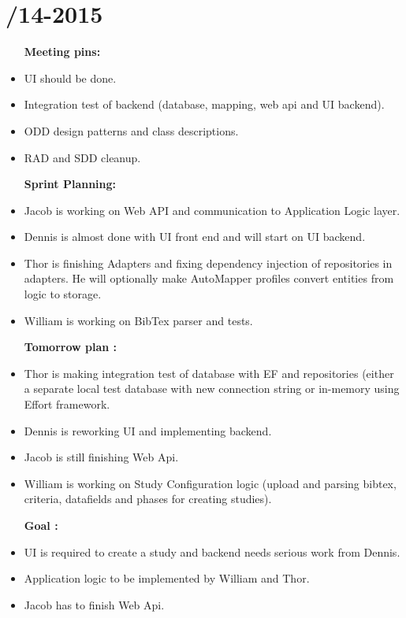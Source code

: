 \section{/14-2015} %
\attend{\at}{\at}{\at}{\at}


\begin{itemize}
	\item [\textbf{Meeting pins:}]
	\item UI should be done.
	\item Integration test of backend (database, mapping, web api and UI backend).
	\item ODD design patterns and class descriptions. 
	\item RAD and SDD cleanup. 
\end{itemize}

\begin{itemize}
	\item [\textbf{Sprint Planning:}]
	\item Jacob is working on Web API and communication to Application Logic layer.
	\item Dennis is almost done with UI front end and will start on UI backend. 
	\item Thor is finishing Adapters and fixing dependency injection of repositories in adapters. He will optionally make AutoMapper profiles convert entities from logic to storage. 
	\item William is working on BibTex parser and tests. 
\end{itemize}

\begin{itemize}
	\item [\textbf{Tomorrow plan :}]
	\item Thor is making integration test of database with EF and repositories (either a separate local test database with new connection string or in-memory using Effort framework. 
	\item Dennis is reworking UI and implementing backend. 
	\item Jacob is still finishing Web Api. 
	\item William is working on Study Configuration logic (upload and parsing bibtex, criteria, datafields and phases for creating studies). 
\end{itemize}

\begin{itemize}
	\item[\textbf{Goal : }]
	\item UI is required to create a study and backend needs serious work from Dennis.
	\item Application logic to be implemented by William and Thor. 
	\item Jacob has to finish Web Api. 
\end{itemize}